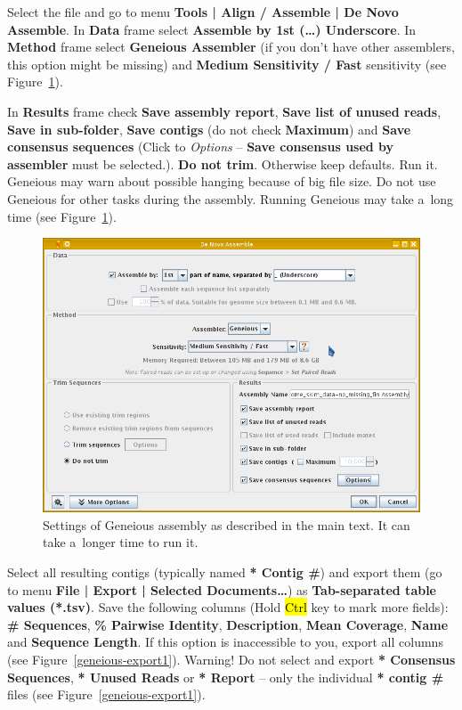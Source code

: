 \documentclass[a4paper, 11pt, twoside]{article}
\renewcommand{\texttt}[1]{\hl{\ttfamily #1}}
\begin{document}
Select the file and go to menu \textbf{Tools | Align / Assemble | De Novo Assemble}. In \textbf{Data} frame select \textbf{Assemble by 1st (\ldots) Underscore}. In \textbf{Method} frame select \textbf{Geneious Assembler} (if you don't have other assemblers, this option might be missing) and \textbf{Medium Sensitivity / Fast} sensitivity (see Figure~\ref{geneious-assembly}).

In \textbf{Results} frame check \textbf{Save assembly report}, \textbf{Save list of unused reads}, \textbf{Save in sub-folder}, \textbf{Save contigs} (do not check \textbf{Maximum}) and \textbf{Save consensus sequences} (Click to \textit{Options} -- \textbf{Save consensus used by assembler} must be selected.). \textbf{Do not trim}. Otherwise keep defaults. Run it. Geneious may warn about possible hanging because of big file size. Do not use Geneious for other tasks during the assembly. Running Geneious may take a~long time (see Figure~\ref{geneious-assembly}).

\begin{figure}[htb]
  \begin{center}
    \includegraphics[width=12cm]{geneious2.png}
  \end{center}
  \caption[Settings of Geneious assembly]{Settings of Geneious assembly as described in the main text. It can take a~longer time to run it.}
  \label{geneious-assembly}
\end{figure}

Select all resulting contigs (typically named \textbf{* Contig \#}) and export them (go to menu \textbf{File | Export | Selected Documents\ldots}) as \textbf{Tab-separated table values (*.tsv)}. Save the following columns (Hold \texttt{Ctrl} key to mark more fields): \textbf{\# Sequences}, \textbf{\% Pairwise Identity}, \textbf{Description}, \textbf{Mean Coverage}, \textbf{Name} and \textbf{Sequence Length}. If this option is inaccessible to you, export all columns (see Figure~\ref{geneious-export1}). Warning! Do not select and export \textbf{* Consensus Sequences}, \textbf{* Unused Reads} or \textbf{* Report} -- only the individual \textbf{* contig \#} files (see Figure~\ref{geneious-export1}).
\end{document}
